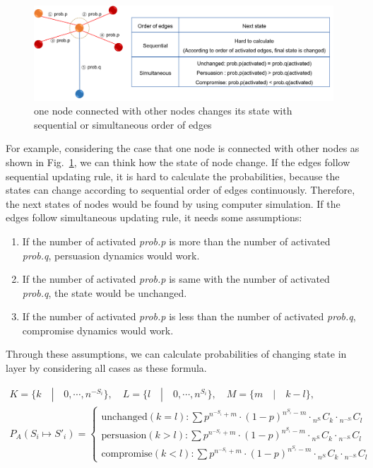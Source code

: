 \begin{figure}[!htb]
	\centering
	\includegraphics[width=\hsize]{figure/chap4_edgeorder_explanation.png}
	\caption{one node connected with other nodes changes its state with sequential or simultaneous order of edges}
	\label{edgeorder_explanation}
\end{figure}  
For example, considering the case that one node is connected with other nodes as shown in Fig.~\ref{edgeorder_explanation}, we can think how the state of node change. 
If the edges follow sequential updating rule, it is hard to calculate the probabilities, because the states can change according to sequential order of edges continuously. Therefore, the next states of nodes would be found by using computer simulation.
If the edges follow simultaneous updating rule, it needs some assumptions: 
\begin{enumerate}
	\item If the number of activated \textit{prob.p} is more than the number of activated \textit{prob.q}, persuasion dynamics would work. 
	\item If the number of activated \textit{prob.p} is same with the number of activated \textit{prob.q}, the state would be unchanged.
	\item If the number of activated \textit{prob.p} is less than the number of activated \textit{prob.q}, compromise dynamics would work.
\end{enumerate}

Through these assumptions, we can calculate probabilities of changing state in layer by considering all cases as these formula.  

\begin{equation}
\begin{array}{l}
K = \{ k \quad|\quad 0, \cdots ,{n^{ - {S_i}}}\}, \quad L = \{l \quad|\quad 0, \cdots ,{n^{{S_i}}}\},
\quad M = \{m \quad|\quad k-l\}, \\
{P_A}({S_i} \mapsto {{S'}_i}) = \begin{cases}
\mbox{unchanged}(k = l):\sum {{p^{{n^{ - {S_i}}}+m}} \cdot {{(1 - p)}^{{n^{{S_i}}}-m}} \cdot {}_{{n^{{S_{^i}}}}}{C_k} \cdot {}_{{n^{ - {S_{^i}}}}}{C_l}} \\
\mbox{persuasion}(k > l):\sum {{p^{{n^{ - {S_i}}}+m}} \cdot {{(1 - p)}^{{n^{{S_i}}}-m}} \cdot {}_{{n^{{S_{^i}}}}}{C_k} \cdot {}_{{n^{ - {S_{^i}}}}}{C_l}} \\
\mbox{compromise}(k < l):\sum {{p^{{n^{ - {S_i}}}+m}} \cdot {{(1 - p)}^{{n^{{S_i}}}-m}} \cdot {}_{{n^{{S_{^i}}}}}{C_k} \cdot {}_{{n^{ - {S_{^i}}}}}{C_l}} 
\end{cases}
\end{array}
\end{equation}


